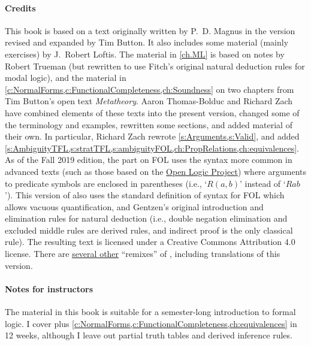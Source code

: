 \paragraph{Credits} This book is based on a text originally written by
P.~D. Magnus in the version revised and expanded by Tim Button. It
also includes some material (mainly exercises) by J.~Robert Loftis.
The material in \cref{ch.ML} is based on notes by Robert Trueman (but
rewritten to use Fitch's original natural deduction rules for modal
logic), and the material in
\cref{c:NormalForms,c:FunctionalCompleteness,ch:Soundness} on two
chapters from Tim Button's open text \textit{Metatheory}. Aaron
Thomas-Bolduc and Richard Zach have combined elements of these texts
into the present version, changed some of the terminology and
examples, rewritten some sections, and added material of their own. In
particular, Richard Zach rewrote \cref{s:Arguments,s:Valid}, and added
\cref{s:AmbiguityTFL,s:stratTFL,s:ambiguityFOL,ch:PropRelations,ch:equivalences}.
As of the Fall 2019 edition, the part on FOL uses the syntax more
common in advanced texts (such as those based on the
\href{https://openlogicproject.org/}{Open Logic Project}) where
arguments to predicate symbols are enclosed in parentheses (i.e.,
`$R(a,b)$' instead of `$Rab$'). This version of \forallx{} also uses
the standard definition of syntax for FOL which allows vacuous
quantification, and Gentzen's original introduction and elimination
rules for natural deduction (i.e., double negation elimination and
excluded middle rules are derived rules, and indirect proof is the
only classical rule). The resulting text is licensed under a Creative
Commons Attribution 4.0 license. There are
\href{https://github.com/OpenLogicProject/OpenLogic/wiki/Other-Logic-Textbooks}{several
other} ``remixes'' of \forallx, including translations of this
version.

\paragraph{Notes for instructors} The material in this book is suitable for a semester-long introduction to formal logic. I cover  plus \cref{c:NormalForms,c:FunctionalCompleteness,ch:equivalences} in 12 weeks, although I leave out partial truth tables and derived inference rules.

